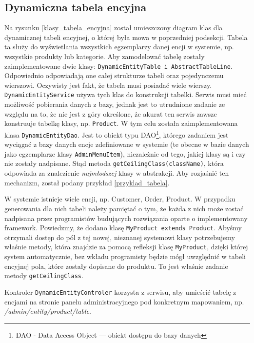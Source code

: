 \subsection{Dynamiczna tabela encyjna}
Na rysunku \ref{klasy_tabela_encyjna} został umieszczony diagram klas dla dynamicznej tabeli encyjnej, o której była mowa w poprzedniej podsekcji. Tabela ta służy do wyświetlania wszystkich egzemplarzy danej encji w systemie, np. wszystkie produkty lub kategorie. Aby zamodelować tabelę zostały zaimplementowane dwie klasy: \texttt{DynamicEntityTable i AbstractTableLine}. Odpowiednio odpowiadają one całej strukturze tabeli oraz pojedynczemu wierszowi. Oczywisty jest fakt, że tabela musi posiadać wiele wierszy. \texttt{DynamicEntityService} używa tych klas do konstrukcji tabelki. Serwis musi mieć możliwość pobierania danych z bazy, jednak jest to utrudnione zadanie ze względu na to, że nie jest z góry określone, że akurat ten serwis zawsze konstruuje tabelkę klasy, np. \texttt{Product}. W tym celu została zaimplementowana klasa \texttt{DynamicEntityDao}. Jest to obiekt typu DAO\footnote{DAO - Data Access Object — obiekt dostępu do bazy danych}, którego zadaniem jest wyciągać z bazy danych encje zdefiniowane w systemie (te obecne w bazie danych jako egzemplarze klasy \texttt{AdminMenuItem}), niezależnie od tego, jakiej klasy są i czy nie zostały nadpisane. Stąd metoda \texttt{getCeilingClass(className)}, która odpowiada za znalezienie \textit{najmłodszej} klasy w abstrakcji. Aby rozjaśnić ten mechanizm, został podany przykład \ref{przyklad_tabela}.
\begin{example}
\label{przyklad_tabela}
	W systemie istnieje wiele encji, np. Customer, Order, Product. W przypadku generowania dla nich tabeli należy pamiętać o tym, że każda z nich może zostać nadpisana przez programistów budujących rozwiązania oparte o implementowany framework. Powiedzmy, że dodano klasę \texttt{MyProduct extends Product}. Abyśmy otrzymali dostęp do pól z tej nowej, nieznanej systemowi klasy potrzebujemy właśnie metody, która znajdzie za pomocą refleksji klasę \texttt{MyProduct}, dzięki której system automatycznie, bez wkładu programisty będzie mógł uwzględnić w tabeli encyjnej pola, które zostały dopisane do produktu. To jest właśnie zadanie metody \texttt{getCeilingClass}. 
\end{example}
Kontroler \texttt{DynamicEntityControler} korzysta z serwisu, aby umieścić tabelę z encjami na stronie panelu administracyjnego pod konkretnym mapowaniem, np. \textit{/admin/entity/product/table}. 
